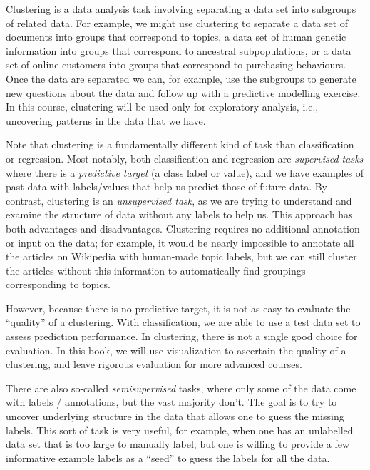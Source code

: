 \documentclass[
]{krantz}
\renewenvironment{quote}{\begin{VF}}{\end{VF}}
\begin{document}
Clustering is a data analysis task involving separating a data set into
subgroups of related data. For example, we might use clustering to separate a
data set of documents into groups that correspond to topics, a data set of human
genetic information into groups that correspond to ancestral subpopulations, or
a data set of online customers into groups that correspond to purchasing
behaviours. Once the data are separated we can, for example, use the subgroups
to generate new questions about the data and follow up with a predictive
modelling exercise. In this course, clustering will be used only for exploratory
analysis, i.e., uncovering patterns in the data that we have.

Note that clustering is a fundamentally different kind of task than
classification or regression. Most notably, both classification and regression
are \emph{supervised tasks} where there is a \emph{predictive target} (a class label or
value), and we have examples of past data with labels/values that help us
predict those of future data. By contrast, clustering is an \emph{unsupervised
task}, as we are trying to understand and examine the structure of data without
any labels to help us. This approach has both advantages and disadvantages.
Clustering requires no additional annotation or input on the data; for example,
it would be nearly impossible to annotate all the articles on Wikipedia with
human-made topic labels, but we can still cluster the articles without this
information to automatically find groupings corresponding to topics.

However, because there is no predictive target, it is not as easy to evaluate
the ``quality'' of a clustering. With classification, we are able to use a test
data set to assess prediction performance. In clustering, there is not a single
good choice for evaluation. In this book, we will use visualization to ascertain
the quality of a clustering, and leave rigorous evaluation for more advanced
courses.

\begin{quote}
There are also so-called \emph{semisupervised} tasks, where only some of the data
come with labels / annotations, but the vast majority don't. The goal
is to try to uncover underlying structure in the data that allows one to
guess the missing labels. This sort of task is very useful, for example, when one
has an unlabelled data set that is too large to manually label, but one is willing to
provide a few informative example labels as a ``seed'' to guess the labels for all the data.
\end{quote}
\end{document}
